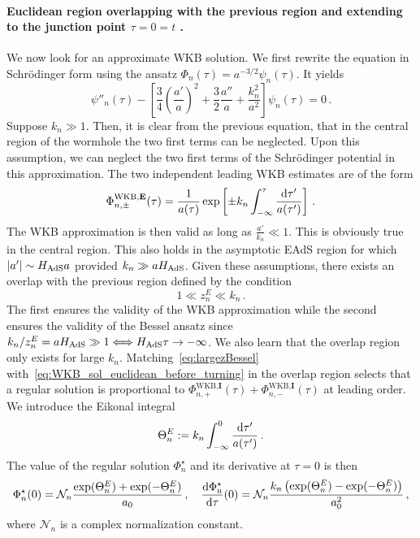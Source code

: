 \documentclass[a4paper,11pt]{article}
\begin{document}
\paragraph{Euclidean region overlapping with the previous region and extending to the junction point $\tau=0=t$ .}
We now look for an approximate WKB solution. We first rewrite the equation in Schrödinger form using the ansatz $\Phi_n(\tau)=a^{-3/2}\psi_n(\tau)$. It yields
\begin{equation}\label{eq:WKB_euclidean_beforeturning}
    \psi''_n(\tau)-\left[\frac{3}{4}\left(\frac{a'}{a}\right)^2+\frac{3}{2}\frac{a''}{a}+\frac{k_n^2}{a^2}\right]\psi_n(\tau)=0\,.
\end{equation}
Suppose $k_n\gg1$. Then, it is clear from the previous equation, that in the central region of the wormhole the two first terms can be neglected. Upon this assumption, we can neglect the two first terms of the Schrödinger potential in this approximation. The two independent leading WKB estimates are of the form
\begin{equation}\label{eq:WKB_sol_euclidean_before_turning}
    \Phi^{\text{WKB},\textbf{E}}_{n,\pm}(\tau) = \frac{1}{a(\tau)}\exp\left[\pm k_n \int_{-\infty}^{\tau}\frac{\rm{d}\tau'}{a(\tau')} \right]\,.
\end{equation}
The WKB approximation is then valid as long as $\frac{a'}{k_n}\ll1$. This is obviously true in the central region. This also holds in the asymptotic EAdS region for which $|a'|\sim H_{\rm AdS} a $ provided $k_n\gg a H_{\rm AdS}$. Given these assumptions, there exists an overlap with the previous region defined by the condition
\begin{equation}
    1\ll z_n^E \ll k_n\,.
\end{equation}
The first ensures the validity of the WKB approximation while the second ensures the validity of the Bessel ansatz since $k_n /  z_n^E = a H_{\rm AdS}\gg 1 \Longleftrightarrow H_{\rm AdS}\tau \to -\infty$. We also learn that the overlap region only exists for large $k_n$. Matching~\eqref{eq:largezBessel} with~\eqref{eq:WKB_sol_euclidean_before_turning} in the overlap region selects that a regular solution is proportional to $\Phi_{n,+}^{\text{WKB},\textbf{I}}(\tau)+\Phi_{n,-}^{\text{WKB},\textbf{I}}(\tau)$ at leading order. We introduce the Eikonal integral
\begin{equation}
    \Theta^E_n :=k_n \int_{-\infty}^{0}\frac{\rm{d}\tau'}{a(\tau')}\,.
\end{equation}
The value of the regular solution $\Phi_n^\star$ and its derivative at $\tau=0$ is then
\begin{equation}
    \Phi_n^\star(0) = \mathcal{N}_n \frac{\exp(\Theta^E_n)+\exp(-\Theta_n^E)}{a_0}\,,\quad \frac{\rm{d}\Phi_n^{\star}}{\rm{d}\tau}(0) = \mathcal{N}_n \frac{k_n\left(\exp(\Theta^E_n)-\exp(-\Theta_n^E)\right)}{a_0^{2}}\,,
\end{equation}
where $\mathcal{N}_n$ is a complex normalization constant.
\end{document}
